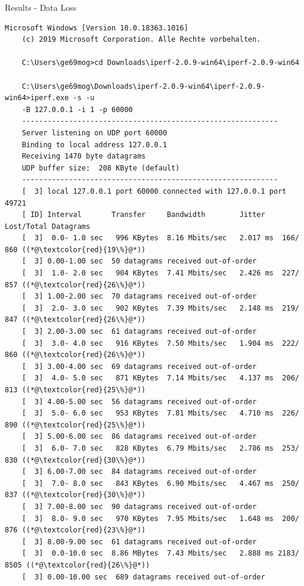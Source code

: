 \documentclass[10pt,t]{beamer}
\begin{document}
\begin{frame}[fragile]{Results - Data Loss}
    \begin{lstlisting}[style=DOS,basicstyle=\fontsize{5}{6}\selectfont]
    Microsoft Windows [Version 10.0.18363.1016]
    (c) 2019 Microsoft Corporation. Alle Rechte vorbehalten.

    C:\Users\ge69mog>cd Downloads\iperf-2.0.9-win64\iperf-2.0.9-win64

    C:\Users\ge69mog\Downloads\iperf-2.0.9-win64\iperf-2.0.9-win64>iperf.exe -s -u
    -B 127.0.0.1 -i 1 -p 60000
    ------------------------------------------------------------
    Server listening on UDP port 60000
    Binding to local address 127.0.0.1
    Receiving 1470 byte datagrams
    UDP buffer size:  208 KByte (default)
    ------------------------------------------------------------
    [  3] local 127.0.0.1 port 60000 connected with 127.0.0.1 port 49721
    [ ID] Interval       Transfer     Bandwidth        Jitter   Lost/Total Datagrams
    [  3]  0.0- 1.0 sec   996 KBytes  8.16 Mbits/sec   2.017 ms  166/  860 ((*@\textcolor{red}{19\%}@*))
    [  3] 0.00-1.00 sec  50 datagrams received out-of-order
    [  3]  1.0- 2.0 sec   904 KBytes  7.41 Mbits/sec   2.426 ms  227/  857 ((*@\textcolor{red}{26\%}@*))
    [  3] 1.00-2.00 sec  70 datagrams received out-of-order
    [  3]  2.0- 3.0 sec   902 KBytes  7.39 Mbits/sec   2.148 ms  219/  847 ((*@\textcolor{red}{26\%}@*))
    [  3] 2.00-3.00 sec  61 datagrams received out-of-order
    [  3]  3.0- 4.0 sec   916 KBytes  7.50 Mbits/sec   1.904 ms  222/  860 ((*@\textcolor{red}{26\%}@*))
    [  3] 3.00-4.00 sec  69 datagrams received out-of-order
    [  3]  4.0- 5.0 sec   871 KBytes  7.14 Mbits/sec   4.137 ms  206/  813 ((*@\textcolor{red}{25\%}@*))
    [  3] 4.00-5.00 sec  56 datagrams received out-of-order
    [  3]  5.0- 6.0 sec   953 KBytes  7.81 Mbits/sec   4.710 ms  226/  890 ((*@\textcolor{red}{25\%}@*))
    [  3] 5.00-6.00 sec  86 datagrams received out-of-order
    [  3]  6.0- 7.0 sec   828 KBytes  6.79 Mbits/sec   2.786 ms  253/  830 ((*@\textcolor{red}{30\%}@*))
    [  3] 6.00-7.00 sec  84 datagrams received out-of-order
    [  3]  7.0- 8.0 sec   843 KBytes  6.90 Mbits/sec   4.467 ms  250/  837 ((*@\textcolor{red}{30\%}@*))
    [  3] 7.00-8.00 sec  90 datagrams received out-of-order
    [  3]  8.0- 9.0 sec   970 KBytes  7.95 Mbits/sec   1.648 ms  200/  876 ((*@\textcolor{red}{23\%}@*))
    [  3] 8.00-9.00 sec  61 datagrams received out-of-order
    [  3]  0.0-10.0 sec  8.86 MBytes  7.43 Mbits/sec   2.888 ms 2183/ 8505 ((*@\textcolor{red}{26\%}@*))
    [  3] 0.00-10.00 sec  689 datagrams received out-of-order
    \end{lstlisting}
\end{frame}
\end{document}

